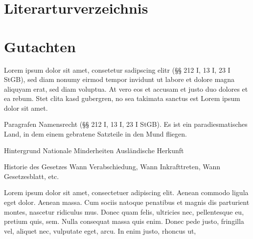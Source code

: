 \documentclass{jura}
\renewcommand*{\mainmatter}{\cleardoublepage\pagenumbering{arabic}}
\begin{document}
	\makeatletter
	\renewcommand\tableofcontents{%
		\@starttoc{toc}}
	\makeatother
	
	\tableofcontents
	
	\newpage
	
	\section*{Literarturverzeichnis}
	
	\renewcommand{\bibname}{}
	\renewcommand{\chapter}[1]{}
	
	
	
	\newpage
	
	
	\mainmatter
	
	\boldmath
	\restoregeometry
	
	\section*{Gutachten}
	
	Lorem ipsum dolor sit amet, consetetur sadipscing elitr (§§ 212 I, 13 I, 23 I StGB), sed diam nonumy eirmod tempor invidunt ut labore et dolore magna aliquyam erat, sed diam voluptua. At vero eos et accusam et justo duo dolores et ea rebum. Stet clita kasd gubergren, no sea takimata sanctus est Lorem ipsum dolor sit amet.
	
	
	Paragrafen
	Namensrecht
	(§§ 212 I, 13 I, 23 I StGB). Es ist ein paradiesmatisches Land, in dem einem gebratene Satzteile in den Mund fliegen. 
	
	
	Hintergrund
	Nationale Minderheiten
	Ausländische Herkunft
	
	Historie des Gesetzes
	Wann Verabschiedung, Wann Inkrafttreten, Wann Gesetzesblatt, etc.
	
	
	Lorem ipsum dolor sit amet, consectetuer adipiscing elit. Aenean commodo ligula eget dolor. Aenean massa. Cum sociis natoque penatibus et magnis dis parturient montes, nascetur ridiculus mus. Donec quam felis, ultricies nec, pellentesque eu, pretium quis, sem. Nulla consequat massa quis enim. Donec pede justo, fringilla vel, aliquet nec, vulputate eget, arcu. In enim justo, rhoncus ut, 
	
\end{document}
